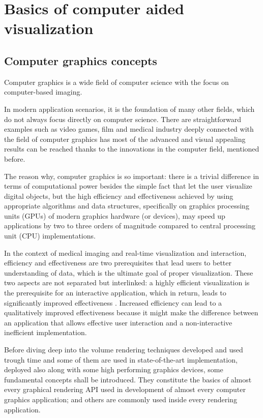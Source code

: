 \documentclass[12pt,a4paper]{extarticle}
\newcommand{\linespace}{\vspace{8pt}}
\begin{document}
\section{Basics of computer aided visualization}
\subsection{Computer graphics concepts} 
Computer graphics is a wide field of computer science with the focus on computer-based imaging.

In modern application scenarios, it is the foundation of many other fields, which do not always focus directly on computer science. There are straightforward examples such as video games, film and medical industry deeply connected with the field of computer graphics has most of the advanced and visual appealing results can be reached thanks to the innovations in the computer field, mentioned before.

The reason why, computer graphics is so important: there is a trivial difference in terms of computational power besides the simple fact that let the user visualize digital objects, but the high efficiency and effectiveness achieved by using appropriate algorithms and data structures, specifically on graphics processing units (GPUs) of modern graphics hardware (or devices), may speed up applications by two to three orders of magnitude compared to central processing unit (CPU) implementations.
\linespace

In the context of medical imaging and real-time visualization and interaction, efficiency and effectiveness are two prerequisites that lead users to better understanding of data, which is the ultimate goal of proper visualization.
These two aspects are not separated but interlinked: a highly efficient visualization is the prerequisite for an interactive application, which in return, leads to significantly improved effectiveness \cite{weiskopf_2006:1}.
Increased efficiency can lead to a qualitatively improved effectiveness because it might make the difference between an application that allows effective user interaction and a non-interactive inefficient implementation.
\linespace

Before diving deep into the volume rendering techniques developed and used trough time and some of them are  used in state-of-the-art implementation, deployed also along with some high performing graphics devices, some fundamental concepts shall be introduced. They constitute the basics of almost every graphical rendering API used in development of almost every computer graphics application; and others are commonly used inside every rendering application.
\end{document}
